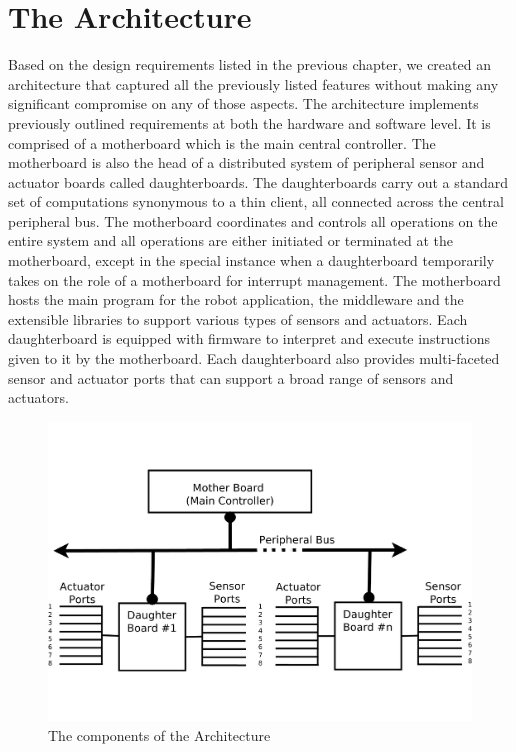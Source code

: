 \section{The Architecture} %
\label{sec:the_architecture}
Based on the design requirements listed in the previous chapter, we created an architecture that captured all the previously listed features without making any significant compromise on any of those aspects. The \xten architecture implements previously outlined requirements at both the hardware and software level. It is comprised of a motherboard which is the main central controller. The motherboard is also the head of a distributed system of peripheral sensor and actuator boards called daughterboards. The daughterboards carry out a standard set of computations synonymous to a thin client, all connected across the central peripheral bus. The motherboard coordinates and controls all operations on the entire system and all operations are either initiated or terminated at the motherboard, except in the special instance when a daughterboard temporarily takes on the role of a motherboard for interrupt management. The motherboard hosts the main program for the robot application, the middleware and the extensible libraries to support various types of sensors and actuators. Each daughterboard is equipped with firmware to interpret and execute instructions given to it by the motherboard. Each daughterboard also provides multi-faceted sensor and actuator ports that can support a broad range of sensors and actuators. 

\begin{figure}[h]
  \begin{center}
    \includegraphics[width=1.0\columnwidth]{Figures/system_block_diagram.pdf}
    \caption{The components of the \xten Architecture}
  \end{center}
\end{figure}

